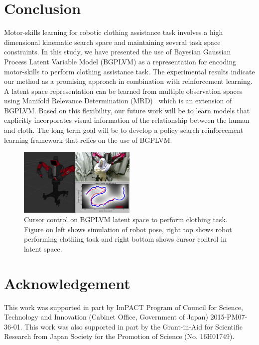 \documentclass{article}
\begin{document}
\section{Conclusion}
\label{section:conclusion}

Motor-skills learning for robotic clothing assistance task involves a high dimensional kinematic search space and maintaining several task space constraints. In this study, we have presented the use of Bayesian Gaussian Process Latent Variable Model (BGPLVM) as a representation for encoding motor-skills to perform clothing assistance task. The experimental results indicate our method as a promising approach in combination with reinforcement learning. A latent space representation can be learned from multiple observation spaces using Manifold Relevance Determination (MRD)~\cite{mrd} which is an extension of BGPLVM. Based on this flexibility, our future work will be to learn models that explicitly incorporates visual information of the relationship between the human and cloth. The long term goal will be to develop a policy search reinforcement learning framework that relies on the use of BGPLVM.

\begin{figure}[t]
  \centering
  \includegraphics[width=0.5\textwidth]{controller2.png}
  \caption{Cursor control on BGPLVM latent space to perform clothing task. Figure on left shows simulation of robot pose, right top shows robot performing clothing task and right bottom shows cursor control in latent space.}
  \label{figure:controller}
\end{figure}

\section*{Acknowledgement}
This work was supported in part by ImPACT Program of Council for Science, Technology and Innovation (Cabinet Office, Government of Japan) 2015-PM07-36-01. This work was also supported in part by the Grant-in-Aid for Scientific Research from Japan Society for the Promotion of Science (No. 16H01749).
\end{document}
